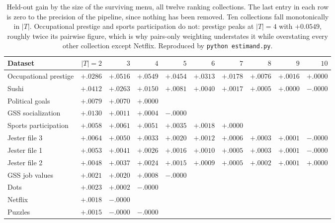 \documentclass[11pt]{article}
\theoremstyle{italichead}
\begin{document}
\begin{table}[htbp]
\centering
\footnotesize
\setlength{\tabcolsep}{4pt}
\begin{tabular}{lrrrrrrrrr}
\toprule
Dataset & $|T|=2$ & $3$ & $4$ & $5$ & $6$ & $7$ & $8$ & $9$ & $10$ \\
\midrule
Occupational prestige & $+.0286$ & $+.0516$ & $+.0549$ & $+.0454$ & $+.0313$ & $+.0178$ & $+.0076$ & $+.0016$ & $+.0000$ \\
Sushi & $+.0412$ & $+.0263$ & $+.0150$ & $+.0081$ & $+.0040$ & $+.0017$ & $+.0005$ & $+.0000$ & $-.0000$ \\
Political goals & $+.0079$ & $+.0070$ & $+.0000$ & & & & & & \\
GSS socialization & $+.0130$ & $+.0011$ & $+.0004$ & $-.0000$ & & & & & \\
Sports participation & $+.0058$ & $+.0061$ & $+.0051$ & $+.0035$ & $+.0018$ & $+.0000$ & & & \\
Jester file 3 & $+.0064$ & $+.0050$ & $+.0033$ & $+.0020$ & $+.0012$ & $+.0006$ & $+.0003$ & $+.0001$ & $-.0000$ \\
Jester file 1 & $+.0053$ & $+.0041$ & $+.0026$ & $+.0016$ & $+.0010$ & $+.0005$ & $+.0003$ & $+.0001$ & $-.0000$ \\
Jester file 2 & $+.0048$ & $+.0037$ & $+.0024$ & $+.0015$ & $+.0009$ & $+.0005$ & $+.0002$ & $+.0001$ & $+.0000$ \\
GSS job values & $+.0021$ & $+.0020$ & $+.0008$ & $-.0000$ & & & & & \\
Dots & $+.0023$ & $+.0002$ & $-.0000$ & & & & & & \\
Netflix & $+.0018$ & $-.0000$ & & & & & & & \\
Puzzles & $+.0015$ & $-.0000$ & $-.0000$ & & & & & & \\
\bottomrule
\end{tabular}
\caption{Held-out gain by the size of the surviving menu, all twelve ranking collections.
The last entry in each row is zero to the precision of the pipeline, since nothing has been
removed. Ten collections fall monotonically in $|T|$. Occupational prestige and sports
participation do not: prestige peaks at $|T| = 4$ with $+0.0549$, roughly twice its pairwise
figure, which is why pairs-only weighting understates it while overstating every other
collection except Netflix.
Reproduced by \texttt{python estimand.py}.}
\label{tab:sizevector}
\end{table}
\end{document}
